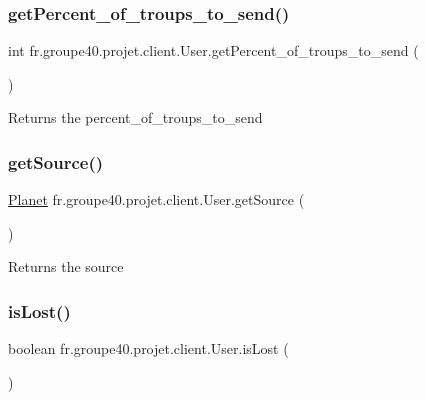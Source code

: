 \subsubsection{\texorpdfstring{get\+Percent\+\_\+of\+\_\+troups\+\_\+to\+\_\+send()}{getPercent\_of\_troups\_to\_send()}}
{\footnotesize\ttfamily int fr.\+groupe40.\+projet.\+client.\+User.\+get\+Percent\+\_\+of\+\_\+troups\+\_\+to\+\_\+send (\begin{DoxyParamCaption}{ }\end{DoxyParamCaption})}

\begin{DoxyReturn}{Returns}
the percent\+\_\+of\+\_\+troups\+\_\+to\+\_\+send 
\end{DoxyReturn}
\mbox{\label{classfr_1_1groupe40_1_1projet_1_1client_1_1_user_a8d5a9ada62388f690f9dd9d70d4f4d1c}} 
\subsubsection{\texorpdfstring{get\+Source()}{getSource()}}
{\footnotesize\ttfamily \hyperlink{classfr_1_1groupe40_1_1projet_1_1model_1_1planets_1_1_planet}{Planet} fr.\+groupe40.\+projet.\+client.\+User.\+get\+Source (\begin{DoxyParamCaption}{ }\end{DoxyParamCaption})}

\begin{DoxyReturn}{Returns}
the source 
\end{DoxyReturn}
\mbox{\label{classfr_1_1groupe40_1_1projet_1_1client_1_1_user_a0e846e067a87f2cedcc43f25968f000f}} 
\subsubsection{\texorpdfstring{is\+Lost()}{isLost()}}
{\footnotesize\ttfamily boolean fr.\+groupe40.\+projet.\+client.\+User.\+is\+Lost (\begin{DoxyParamCaption}{ }\end{DoxyParamCaption})}



